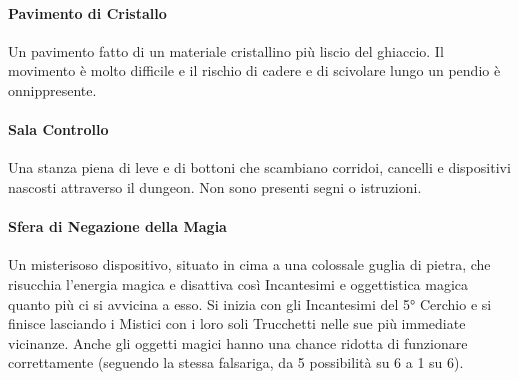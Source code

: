 \documentclass[itdr]{subfiles}
\begin{document}
\vfill
\paragraph{Pavimento di Cristallo}
Un pavimento fatto di un materiale cristallino più liscio del ghiaccio. Il movimento è molto difficile e il rischio di cadere e di scivolare lungo un pendio è onnippresente.

\vfill
\paragraph{Sala Controllo}
Una stanza piena di leve e di bottoni che scambiano corridoi, cancelli e dispositivi nascosti attraverso il dungeon. Non sono presenti segni o istruzioni.

\vfill
\paragraph{Sfera di Negazione della Magia}
Un misterisoso dispositivo, situato in cima a una colossale guglia di pietra, che risucchia l'energia magica e disattiva così Incantesimi e oggettistica magica quanto più ci si avvicina a esso. Si inizia con gli Incantesimi del 5° Cerchio e si finisce lasciando i Mistici con i loro soli Trucchetti nelle sue più immediate vicinanze. Anche gli oggetti magici hanno una chance ridotta di funzionare correttamente (seguendo la stessa falsariga, da 5 possibilità su 6 a 1 su 6).

\vfill
\end{document}
